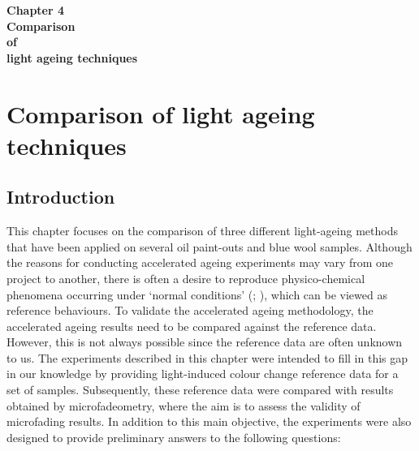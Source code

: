 


\pagecolor{mygray}

\begin{titlepage}
   \begin{center}
       \vspace*{3cm}
       {\fontsize{40pt}{46pt}\selectfont \textbf{Chapter 4}}\\       
       \vspace*{3cm}
       {\fontsize{30pt}{36pt}\selectfont \textbf{Comparison} \\[1cm]
        \fontsize{30pt}{36pt}\selectfont \textbf{of} \\[1cm]
        \fontsize{30pt}{36pt}\selectfont \textbf{light ageing techniques}} \\          
   \end{center}
\end{titlepage}

\restoregeometry
\pagecolor{white}


\chapter{ Comparison of light ageing techniques}
\label{ch:ch4_light-ageing}




\section{Introduction}


This chapter focuses on the comparison of three different light-ageing methods that have been applied on several oil paint-outs and blue wool samples. Although the reasons for conducting accelerated ageing experiments may vary from one project to another, there is often a desire to reproduce physico-chemical phenomena occurring under ‘normal conditions’  (\citealp[XV]{feller_accelerated_1994}; \citealp[29]{van_giesbergen_wilting_2019}), which can be viewed as reference behaviours. To validate the accelerated ageing methodology, the accelerated ageing results need to be compared against the reference data. However, this is not always possible since the reference data are often unknown to us. The experiments described in this chapter were intended to fill in this gap in our knowledge by providing light-induced colour change reference data for a set of samples. Subsequently, these reference data were compared with results obtained by microfadeometry, where the aim is to assess the validity of microfading results. In addition to this main objective, the experiments were also designed to provide preliminary answers to the following questions:

